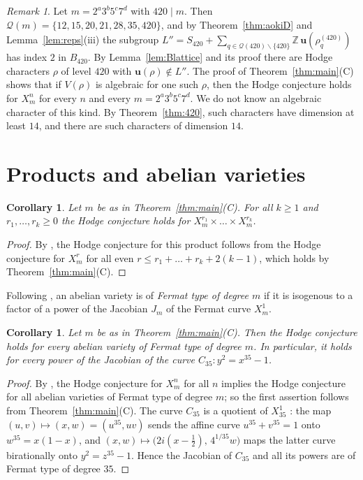 \documentclass[11pt]{amsart}
\newtheorem{corollary}[theorem]{Corollary}
\theoremstyle{definition}
\theoremstyle{remark}
\newtheorem{remark}[theorem]{Remark}
\numberwithin{equation}{section}
\newcommand{\Z}{\mathbb{Z}}
\newcommand{\cQ}{\mathcal{Q}}
\newcommand{\uu}{\mathbf{u}}
\newcommand{\sm}{\smallsetminus}
\begin{document}
\begin{remark}\label{rem:420}
Let $m=2^a3^b5^c7^d$ with $420\mid m$. Then $\cQ(m)=\{12,15,20,21,28,35,420\}$, and by Theorem~\ref{thm:aokiD} and Lemma~\ref{lem:reps}(iii) the subgroup $L''=S_{420}+\sum_{q\in\cQ(420)\sm\{420\}}\Z\,\uu(\rho^{(420)}_q)$ has index $2$ in $B_{420}$. By Lemma~\ref{lem:Blattice} and its proof there are Hodge characters $\rho$ of level $420$ with $\uu(\rho)\notin L''$. The proof of Theorem~\ref{thm:main}(C) shows that if $V(\rho)$ is algebraic for one such $\rho$, then the Hodge conjecture holds for $X^n_m$ for every $n$ and every $m=2^a3^b5^c7^d$. We do not know an algebraic character of this kind. By Theorem~\ref{thm:420}, such characters have dimension at least $14$, and there are such characters of dimension $14$.
\end{remark}

\section{Products and abelian varieties}\label{sec:products}

\begin{corollary}\label{cor:products}
Let $m$ be as in Theorem~\ref{thm:main}(C). For all $k\ge1$ and $r_1,\dots,r_k\ge0$ the Hodge conjecture holds for $X^{r_1}_m\times\dots\times X^{r_k}_m$.
\end{corollary}

\begin{proof}
By \cite[Thm.~IV]{Sh79}, the Hodge conjecture for this product follows from the Hodge conjecture for $X^r_m$ for all even $r\le r_1+\dots+r_k+2(k-1)$, which holds by Theorem~\ref{thm:main}(C).
\end{proof}

Following \cite{Ao00}, an abelian variety is of \emph{Fermat type of degree $m$} if it is isogenous to a factor of a power of the Jacobian $J_m$ of the Fermat curve $X^1_m$.

\begin{corollary}\label{cor:abelian}
Let $m$ be as in Theorem~\ref{thm:main}(C). Then the Hodge conjecture holds for every abelian variety of Fermat type of degree $m$. In particular, it holds for every power of the Jacobian of the curve $C_{35}\colon y^2=x^{35}-1$.
\end{corollary}

\begin{proof}
By \cite[Cor.~3.2]{Ao00}, the Hodge conjecture for $X^n_m$ for all $n$ implies the Hodge conjecture for all abelian varieties of Fermat type of degree $m$; so the first assertion follows from Theorem~\ref{thm:main}(C). The curve $C_{35}$ is a quotient of $X^1_{35}$ \cite[p.~178]{Ao00}: the map $(u,v)\mapsto(x,w)=(u^{35},uv)$ sends the affine curve $u^{35}+v^{35}=1$ onto $w^{35}=x(1-x)$, and $(x,w)\mapsto\bigl(2i(x-\tfrac12),\,4^{1/35}w\bigr)$ maps the latter curve birationally onto $y^2=z^{35}-1$. Hence the Jacobian of $C_{35}$ and all its powers are of Fermat type of degree $35$.
\end{proof}
\end{document}

